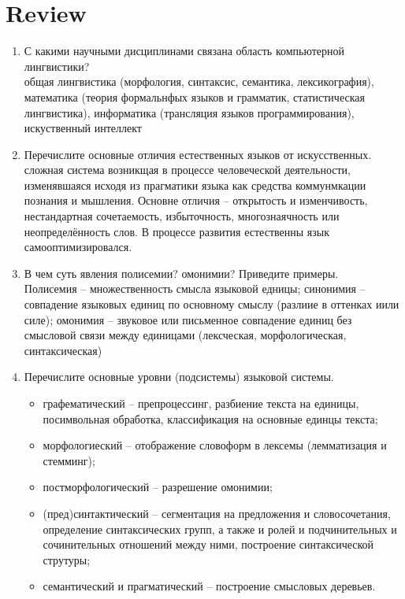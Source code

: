 \documentclass[a4paper]{article}
\begin{document}
\section{Review} %
\label{sec:review}
\begin{enumerate}
	\item С какими научными дисциплинами связана область компьютерной лингвистики?\hfill\\
	общая лингвистика (морфология, синтаксис, семантика, лексикография), математика (теория формальнфых языков и грамматик, статистическая лингвистика), информатика (трансляция языков программирования), искуственный интеллект

	\item Перечислите основные отличия естественных языков от искусственных.\hfill\\
	сложная система возникщая в процессе человеческой деятельности, изменявшаяся исходя из прагматики языка как средства коммунмкации познания и мышления. Основне отличия -- открытость и изменчивость, нестандартная сочетаемость, избыточность, многознаячность или неопределённость слов. В процессе развития естественны язык самооптимизировался.

	\item В чем суть явления полисемии? омонимии? Приведите примеры.\hfill\\
	Полисемия -- множественность смысла языковой едницы; синонимия -- совпадение языковых единиц по основному смыслу (разлиие в оттенках иили силе); омонимия -- звуковое или письменное совпадение единиц без смысловой связи между единицами (лексческая, морфологическая, синтаксическая)

	\item Перечислите основные уровни (подсистемы) языковой системы.\hfill\\ \begin{itemize}
		\item графематический -- препроцессинг, разбиение текста на единицы, посимвольная обработка, классификация на основные единцы текста;
		\item морфологиеский -- отображение словоформ в лексемы (лемматизация и стемминг);
		\item постморфологический -- разрешение омонимии;
		\item (пред)синтактический -- сегментация на предложения и словосочетания, определение синтаксических групп, а также и ролей и подчинительных и сочинительных отношений между ними, построение синтаксической струтуры;
		\item семантический и прагматический -- построение смысловых деревьев. 
	\end{itemize}


\end{enumerate}
\end{document}
